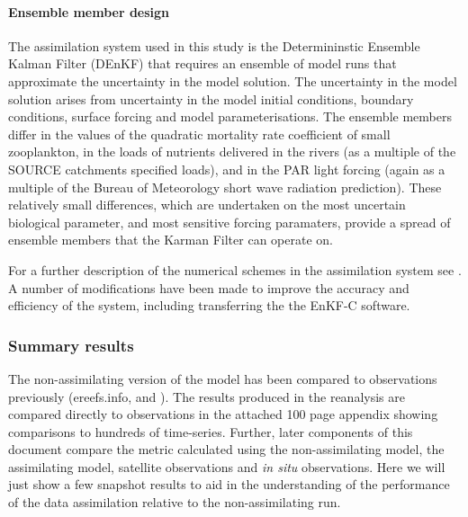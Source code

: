 \paragraph{Ensemble member design}

The assimilation system used in this study is the Determininstic Ensemble Kalman Filter (DEnKF) that
requires an ensemble of model runs that approximate the uncertainty in the model solution.  The
uncertainty in the model solution arises from uncertainty in the model initial conditions, boundary
conditions, surface forcing and model parameterisations.  The ensemble members differ in the values
of the quadratic mortality rate coefficient of small zooplankton, in the loads of nutrients
delivered in the rivers (as a multiple of the SOURCE catchments specified loads), and in the PAR
light forcing (again as a multiple of the Bureau of Meteorology short wave radiation
prediction). These relatively small differences, which are undertaken on the most uncertain
biological parameter, and most sensitive forcing paramaters, provide a spread of ensemble members
that the Karman Filter can operate on.

For a further description of the numerical schemes in the assimilation system see \citep{Jones16}. A
number of modifications have been made to improve the accuracy and efficiency of the system,
including transferring the the EnKF-C software.

\subsubsection{Summary results}

The non-assimilating version of the model has been compared to observations previously (ereefs.info,
\citet{Baird16a} and \citet{Skerratt18}). The results produced in the reanalysis are compared
directly to observations in the attached 100 page appendix showing comparisons to hundreds of
time-series. Further, later components of this document compare the metric calculated using the
non-assimilating model, the assimilating model, satellite observations and \textit{in situ}
observations. Here we will just show a few snapshot results to aid in the understanding of the
performance of the data assimilation relative to the non-assimilating run.

